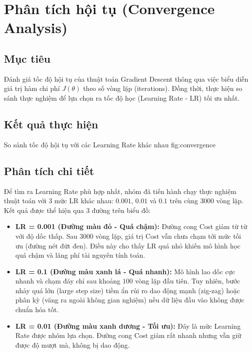 \section{Phân tích hội tụ (Convergence Analysis)}

\subsection{Mục tiêu}
Đánh giá tốc độ hội tụ của thuật toán Gradient Descent thông qua việc biểu diễn giá trị hàm chi phí \(J(\theta)\) theo số vòng lặp (iterations). Đồng thời, thực hiện so sánh thực nghiệm để lựa chọn ra tốc độ học (Learning Rate - LR) tối ưu nhất.

\subsection{Kết quả thực hiện}

{So sánh tốc độ hội tụ với các Learning Rate khác nhau}
{fig:convergence}

\subsection{Phân tích chi tiết}

Để tìm ra Learning Rate phù hợp nhất, nhóm đã tiến hành chạy thực nghiệm thuật toán với 3 mức LR khác nhau: \(0.001\), \(0.01\) và \(0.1\) trên cùng \(3000\) vòng lặp. Kết quả được thể hiện qua 3 đường trên biểu đồ:

\begin{itemize}
    \item \textbf{LR = 0.001 (Đường màu đỏ - Quá chậm):} Đường cong Cost giảm từ từ với độ dốc thấp. Sau \(3000\) vòng lặp, giá trị Cost vẫn chưa chạm tới mức tối ưu (đường nét đứt đen). Điều này cho thấy LR quá nhỏ khiến mô hình học quá chậm và lãng phí tài nguyên tính toán.
    
    \item \textbf{LR = 0.1 (Đường màu xanh lá - Quá nhanh):} Mô hình lao dốc cực nhanh và chạm đáy chỉ sau khoảng \(100\) vòng lặp đầu tiên. Tuy nhiên, bước nhảy quá lớn (large step size) tiềm ẩn rủi ro dao động mạnh (zig-zag) hoặc phân kỳ (văng ra ngoài không gian nghiệm) nếu dữ liệu đầu vào không được chuẩn hóa tốt.
    
    \item \textbf{LR = 0.01 (Đường màu xanh dương - Tối ưu):} Đây là mức Learning Rate được nhóm lựa chọn. Đường cong Cost giảm rất nhanh nhưng vẫn giữ được độ mượt mà, không bị dao động. 
\end{itemize}

